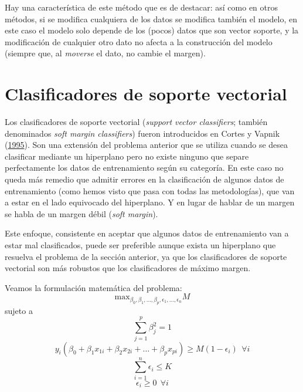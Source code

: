 \documentclass[
  spanish,
]{book}
\theoremstyle{break}
\theoremstyle{definition}
\theoremstyle{definition}
\theoremstyle{definition}
\theoremstyle{remark}
\begin{document}
Hay una característica de este método que es de destacar: así como en otros métodos, si se modifica cualquiera de los datos se modifica también el modelo, en este caso el modelo solo depende de los (pocos) datos que son vector soporte, y la modificación de cualquier otro dato no afecta a la construcción del modelo (siempre que, al \emph{moverse} el dato, no cambie el margen).

\hypertarget{clasificadores-de-soporte-vectorial}{%
\section{Clasificadores de soporte vectorial}\label{clasificadores-de-soporte-vectorial}}

Los clasificadores de soporte vectorial (\emph{support vector classifiers}; también denominados \emph{soft margin classifiers}) fueron introducidos en Cortes y Vapnik (\protect\hyperlink{ref-cortes1995support}{1995}). Son una extensión del problema anterior que se utiliza cuando se desea clasificar mediante un hiperplano pero no existe ninguno que separe perfectamente los datos de entrenamiento según su categoría. En este caso no queda más remedio que admitir errores en la clasificación de algunos datos de entrenamiento (como hemos visto que pasa con todas las metodologías), que van a estar en el lado equivocado del hiperplano. Y en lugar de hablar de un margen se habla de un margen débil (\emph{soft margin}).

Este enfoque, consistente en aceptar que algunos datos de entrenamiento van a estar mal clasificados, puede ser preferible aunque exista un hiperplano que resuelva el problema de la sección anterior, ya que los clasificadores de soporte vectorial son más robustos que los clasificadores de máximo margen.

Veamos la formulación matemática del problema:
\[\mbox{max}_{\beta_0, \beta_1,\ldots, \beta_p, \epsilon_1,\ldots, \epsilon_n} M\]
sujeto a
\[\sum_{j=1}^p \beta_j^2 = 1\]
\[ y_i(\beta_0 + \beta_1 x_{1i} + \beta_2 x_{2i} + \ldots + \beta_p x_{pi}) \ge M(1 - \epsilon_i) \ \ \forall i\]
\[\sum_{i=1}^n \epsilon_i \le K\]
\[\epsilon_i \ge 0 \ \ \forall i\]
\end{document}
